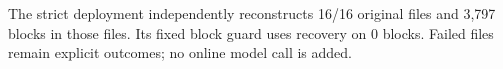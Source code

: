 The strict deployment independently reconstructs 16/16 original files and 3,797 blocks in those files. Its fixed block guard uses recovery on 0 blocks. Failed files remain explicit outcomes; no online model call is added.
